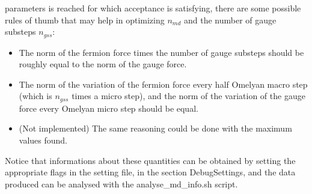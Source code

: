 parameters is reached for which acceptance is satisfying, there are some 
possible rules of thumb that may help in optimizing $n_{md}$ and the number 
of gauge substeps $n_{gss}$:
\begin{itemize}
    \item The norm of the fermion force times the number of gauge substeps should 
        be 
        roughly equal to the norm of the gauge force.
    \item The norm of the variation of the fermion force every half Omelyan macro 
        step 
        (which is $n_{gss}$ times a micro step), and the norm of the variation of the 
        gauge 
        force every Omelyan micro step should be equal.
    \item (Not implemented) The same reasoning could be done with the maximum values 
        found.
\end{itemize}

Notice that informations about these quantities can be obtained by setting the appropriate flags in the setting file, in the section {\sf DebugSettings}, and the 
data produced can be analysed with the {\sf analyse\_md\_info.sh} script.







